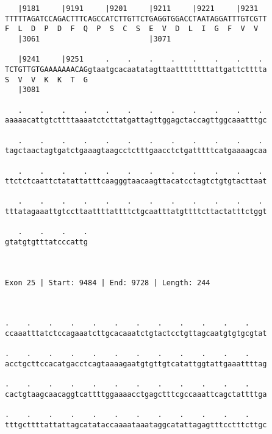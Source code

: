 \documentclass{article}
\begin{document}
\begin{Verbatim}
   |9181     |9191     |9201     |9211     |9221     |9231  
TTTTTAGATCCAGACTTTCAGCCATCTTGTTCTGAGGTGGACCTAATAGGATTTGTCGTT
F  L  D  P  D  F  Q  P  S  C  S  E  V  D  L  I  G  F  V  V  
   |3061                         |3071                      
  
   |9241     |9251     .    .    .    .    .    .    .    . 
TCTGTTGTGAAAAAAACAGgtaatgcacaatatagttaattttttttattgattctttta
S  V  V  K  K  T  G                                         
   |3081                                                    
  
   .    .    .    .    .    .    .    .    .    .    .    . 
aaaaacattgtcttttaaaatctcttatgattagttggagctaccagttggcaaatttgc
                                                            
   .    .    .    .    .    .    .    .    .    .    .    . 
tagctaactagtgatctgaaagtaagcctctttgaacctctgatttttcatgaaaagcaa
                                                            
   .    .    .    .    .    .    .    .    .    .    .    . 
ttctctcaattctatattatttcaagggtaacaagttacatcctagtctgtgtacttaat
                                                            
   .    .    .    .    .    .    .    .    .    .    .    . 
tttatagaaattgtccttaattttattttctgcaatttatgttttcttactatttctggt
                                                            
   .    .    .    .
gtatgtgtttatcccattg
                   
                   
 
Exon 25 | Start: 9484 | End: 9728 | Length: 244



.    .    .    .    .    .    .    .    .    .    .    .    
ccaaatttatctccagaaatcttgcacaaatctgtactcctgttagcaatgtgtgcgtat
                                                            
.    .    .    .    .    .    .    .    .    .    .    .    
acctgcttccacatgacctcagtaaaagaatgtgttgtcatattggtattgaaattttag
                                                            
.    .    .    .    .    .    .    .    .    .    .    .    
cactgtaagcaacaggtcattttggaaaacctgagctttcgccaaattcagctattttga
                                                            
.    .    .    .    .    .    .    .    .    .    .    .    
tttgcttttattattagcatataccaaaataaataggcatattagagtttcctttcttgc
                                                            

\end{Verbatim}
\end{document}

